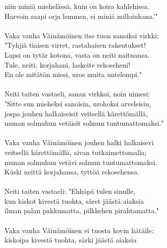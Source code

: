 niin miniä miehelässä, kuin on koira kahlehissa.                \\
Harvoin saapi orja lemmen, ei miniä milloinkana.'"              \\
                                                                \\
Vaka vanha Väinämöinen itse tuon sanoiksi virkki:               \\
"Tyhjiä tiaisen virret, rastahaisen raksutukset!                \\
Lapsi on tytär kotona, vasta on neiti naituansa.                \\
Tule, neiti, korjahani, laskeite rekoseheni!                    \\
En ole mitätön miesi, uros muita untelompi."                    \\
                                                                \\
Neiti taiten vastaeli, sanan virkkoi, noin nimesi:              \\
"Sitte sun mieheksi sanoisin, urohoksi arveleisin,              \\
jospa jouhen halkaiseisit veitsellä kärettömällä,               \\
munan solmuhun vetäisit solmun tuntumattomaksi."                \\
                                                                \\
Vaka vanha Väinämöinen jouhen halki halkaisevi                  \\
veitsellä kärettömällä, aivan tutkaimettomalla;                 \\
munan solmuhun vetävi solmun tuntumattomaksi.                   \\
Käski neittä korjahansa, tyttöä rekosehensa.                    \\
                                                                \\
Neiti taiten vastaeli: "Ehkäpä tulen sinulle,                   \\
kun kiskot kivestä tuohta, säret jäästä aiaksia                 \\
ilman palan pakkumatta, pilkkehen pirahtamatta."                \\
                                                                \\
Vaka vanha Väinämöinen ei tuosta kovin hätäile:                 \\
kiskoipa kivestä tuohta, särki jäästä aiaksia                   \\
